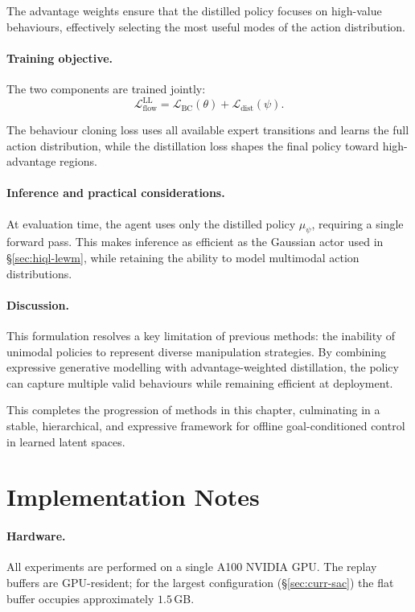 The advantage weights ensure that the distilled policy focuses on
high-value behaviours, effectively selecting the most useful modes of
the action distribution.

\paragraph{Training objective.}
The two components are trained jointly:
\begin{equation}
\mathcal{L}^{\mathrm{LL}}_{\mathrm{flow}}
= \mathcal{L}_{\mathrm{BC}}(\theta)
+ \mathcal{L}_{\mathrm{dist}}(\psi).
\label{eq:flow-total-clean}
\end{equation}

The behaviour cloning loss uses all available expert transitions and
learns the full action distribution, while the distillation loss shapes
the final policy toward high-advantage regions.

\paragraph{Inference and practical considerations.}
At evaluation time, the agent uses only the distilled policy
$\mu_\psi$, requiring a single forward pass. This makes inference as
efficient as the Gaussian actor used in \S\ref{sec:hiql-lewm}, while
retaining the ability to model multimodal action distributions.

\paragraph{Discussion.}
This formulation resolves a key limitation of previous methods: the
inability of unimodal policies to represent diverse manipulation
strategies. By combining expressive generative modelling with
advantage-weighted distillation, the policy can capture multiple valid
behaviours while remaining efficient at deployment.

This completes the progression of methods in this chapter, culminating
in a stable, hierarchical, and expressive framework for offline
goal-conditioned control in learned latent spaces.

\section{Implementation Notes}
\label{sec:impl}

\paragraph{Hardware.} All experiments are performed on a single A100
NVIDIA GPU. The replay buffers are GPU-resident; for the largest
configuration (\S\ref{sec:curr-sac}) the flat buffer occupies
approximately $1.5$\,GB.

